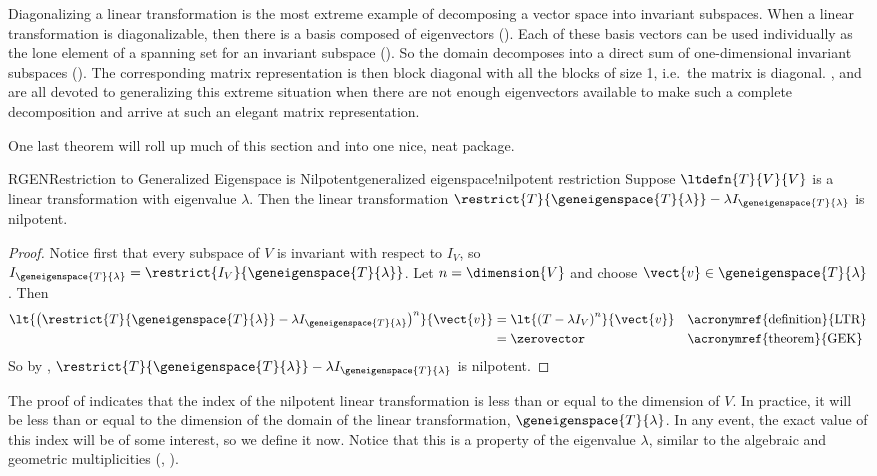 %
Diagonalizing a linear transformation is the most extreme example of decomposing a vector space into invariant subspaces.  When a linear transformation is diagonalizable, then there is a basis composed of eigenvectors ().  Each of these basis vectors can be used individually as the lone element of a spanning set for an invariant subspace ().  So the domain decomposes into a direct sum of one-dimensional invariant subspaces ().  The corresponding matrix representation is then block diagonal with all the blocks of size 1, i.e.\ the matrix is diagonal.  ,  and  are all devoted to generalizing this extreme situation when there are not enough eigenvectors available to make such a complete decomposition and arrive at such an elegant matrix representation.\par
%
One last theorem will roll up much of this section and  into one nice, neat package.
%
\begin{theorem}{RGEN}{Restriction to Generalized Eigenspace is Nilpotent}{generalized eigenspace!nilpotent restriction}
Suppose $\ltdefn{T}{V}{V}$ is a linear transformation with eigenvalue $\lambda$.  Then the linear transformation $\restrict{T}{\geneigenspace{T}{\lambda}}-\lambda I_{\geneigenspace{T}{\lambda}}$ is nilpotent.
\end{theorem}
%
\begin{proof}
Notice first that every subspace of $V$ is invariant with respect to $I_V$, so $I_{\geneigenspace{T}{\lambda}}=\restrict{I_V}{\geneigenspace{T}{\lambda}}$.    Let $n=\dimension{V}$ and choose $\vect{v}\in\geneigenspace{T}{\lambda}$.  Then
%
\begin{align*}
\lt{\left(\restrict{T}{\geneigenspace{T}{\lambda}}-\lambda I_{\geneigenspace{T}{\lambda}}\right)^n}{\vect{v}}
&=\lt{\left(T-\lambda I_V\right)^n}{\vect{v}}&&\text{\acronymref{definition}{LTR}}\\
&=\zerovector&&\text{\acronymref{theorem}{GEK}}
\end{align*}
%
So by , $\restrict{T}{\geneigenspace{T}{\lambda}}-\lambda I_{\geneigenspace{T}{\lambda}}$ is nilpotent.
\end{proof}
%
The proof of  indicates that the index of the nilpotent linear transformation is less than or equal to the dimension of $V$.  In practice, it will be less than or equal to the dimension of the domain of the linear transformation, $\geneigenspace{T}{\lambda}$.  In any event, the exact value of this index will be of some interest, so we define it now.  Notice that this is a property of the eigenvalue $\lambda$, similar to the algebraic and geometric multiplicities (, ).
